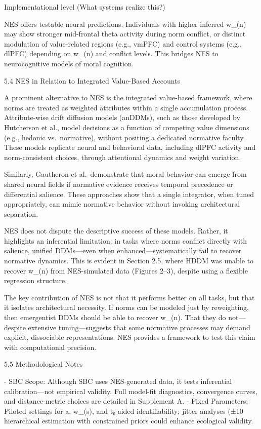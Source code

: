 Implementational level (What systems realize this?)

NES offers testable neural predictions. Individuals with higher inferred
w_(n) may show stronger mid-frontal theta activity during norm conflict,
or distinct modulation of value-related regions (e.g., vmPFC) and
control systems (e.g., dlPFC) depending on w_(n) and conflict levels.
This bridges NES to neurocognitive models of moral cognition.

5.4 NES in Relation to Integrated Value-Based Accounts

A prominent alternative to NES is the integrated value-based framework,
where norms are treated as weighted attributes within a single
accumulation process. Attribute-wise drift diffusion models (anDDMs),
such as those developed by Hutcherson et al., model decisions as a
function of competing value dimensions (e.g., hedonic vs. normative),
without positing a dedicated normative faculty. These models replicate
neural and behavioral data, including dlPFC activity and norm-consistent
choices, through attentional dynamics and weight variation.

Similarly, Gautheron et al. demonstrate that moral behavior can emerge
from shared neural fields if normative evidence receives temporal
precedence or differential salience. These approaches show that a single
integrator, when tuned appropriately, can mimic normative behavior
without invoking architectural separation.

NES does not dispute the descriptive success of these models. Rather, it
highlights an inferential limitation: in tasks where norms conflict
directly with salience, unified DDMs—even when enhanced—systematically
fail to recover normative dynamics. This is evident in Section 2.5,
where HDDM was unable to recover w_(n) from NES-simulated data (Figures
2–3), despite using a flexible regression structure.

The key contribution of NES is not that it performs better on all tasks,
but that it isolates architectural necessity. If norms can be modeled
just by reweighting, then emergentist DDMs should be able to recover
w_(n). That they do not—despite extensive tuning—suggests that some
normative processes may demand explicit, dissociable representations.
NES provides a framework to test this claim with computational
precision.

5.5 Methodological Notes

- SBC Scope: Although SBC uses NES-generated data, it tests inferential
  calibration—not empirical validity. Full model-fit diagnostics,
  convergence curves, and distance-metric choices are detailed in
  Supplement A.
- Fixed Parameters: Piloted settings for a, w_(s), and t₀ aided
  identifiability; jitter analyses (±10%
  hierarchical estimation with constrained priors could enhance
  ecological validity.

